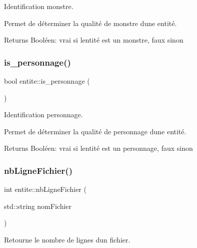 Identification monstre. 

Permet de déterminer la qualité de monstre d\textquotesingle{}une entité. \begin{DoxyReturn}{Returns}
Booléen\+: vrai si l\textquotesingle{}entité est un monstre, faux sinon 
\end{DoxyReturn}
\mbox{\label{classentite_a191b1da1ad1198918c533e552148b8b9}} 
\subsubsection{\texorpdfstring{is\+\_\+personnage()}{is\_personnage()}}
{\footnotesize\ttfamily bool entite\+::is\+\_\+personnage (\begin{DoxyParamCaption}{ }\end{DoxyParamCaption})}



Identification personnage. 

Permet de déterminer la qualité de personnage d\textquotesingle{}une entité. \begin{DoxyReturn}{Returns}
Booléen\+: vrai si l\textquotesingle{}entité est un personnage, faux sinon 
\end{DoxyReturn}
\mbox{\label{classentite_a983d51dcdfaaddaf95096587ea33a3ec}} 
\subsubsection{\texorpdfstring{nb\+Ligne\+Fichier()}{nbLigneFichier()}}
{\footnotesize\ttfamily int entite\+::nb\+Ligne\+Fichier (\begin{DoxyParamCaption}\item[{std\+::string}]{nom\+Fichier }\end{DoxyParamCaption})}



Retourne le nombre de lignes d\textquotesingle{}un fichier. 

